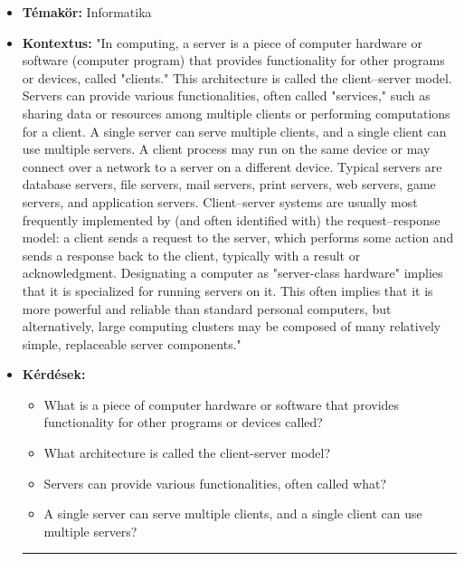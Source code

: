 \begin{itemize}
\hrule

\item \textbf{Témakör:} Informatika
\item \textbf{Kontextus:} "In computing, a server is a piece of computer hardware or software (computer program) that provides functionality for other programs or devices, called "clients." This architecture is called the client–server model. Servers can provide various functionalities, often called "services," such as sharing data or resources among multiple clients or performing computations for a client. A single server can serve multiple clients, and a single client can use multiple servers. A client process may run on the same device or may connect over a network to a server on a different device. Typical servers are database servers, file servers, mail servers, print servers, web servers, game servers, and application servers. Client–server systems are usually most frequently implemented by (and often identified with) the request–response model: a client sends a request to the server, which performs some action and sends a response back to the client, typically with a result or acknowledgment. Designating a computer as "server-class hardware" implies that it is specialized for running servers on it. This often implies that it is more powerful and reliable than standard personal computers, but alternatively, large computing clusters may be composed of many relatively simple, replaceable server components."
\item \textbf{Kérdések:} 
	\begin{itemize}
		\item What is a piece of computer hardware or software that provides functionality for other programs or devices called?
		\item What architecture is called the client-server model?
		\item Servers can provide various functionalities, often called what?
		\item A single server can serve multiple clients, and a single client can use multiple servers?
	\end{itemize}

\hrule


\end{itemize}
